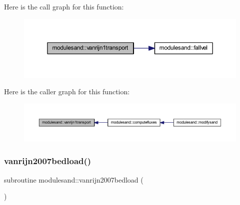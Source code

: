 Here is the call graph for this function\+:\nopagebreak
\begin{figure}[H]
\begin{center}
\leavevmode
\includegraphics[width=350pt]{namespacemodulesand_abf8eba23882b69da0ba972e0af5b81ad_cgraph}
\end{center}
\end{figure}
Here is the caller graph for this function\+:\nopagebreak
\begin{figure}[H]
\begin{center}
\leavevmode
\includegraphics[width=350pt]{namespacemodulesand_abf8eba23882b69da0ba972e0af5b81ad_icgraph}
\end{center}
\end{figure}
\mbox{\label{namespacemodulesand_a977db0c285efea44306fcc4bd320dc10}} 
\subsubsection{\texorpdfstring{vanrijn2007bedload()}{vanrijn2007bedload()}}
{\footnotesize\ttfamily subroutine modulesand\+::vanrijn2007bedload (\begin{DoxyParamCaption}{ }\end{DoxyParamCaption})\hspace{0.3cm}{\ttfamily [private]}}


